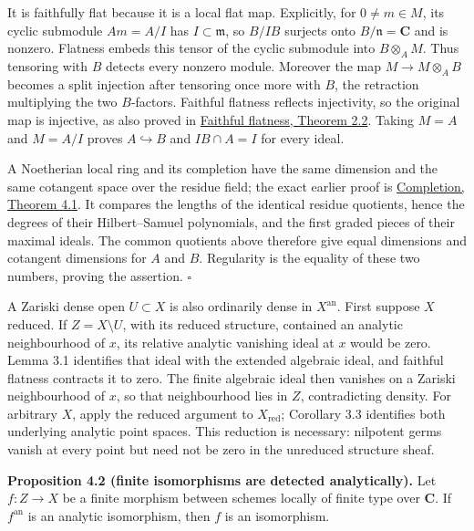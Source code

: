 \documentclass[11pt]{article}
\begin{document}
It is faithfully flat because it is a local flat map. Explicitly, for
\(0\ne m\in M\), its cyclic submodule \(Am=A/I\) has
\(I\subset\mathfrak m\), so \(B/IB\) surjects onto
\(B/\mathfrak n=\mathbf C\) and is nonzero. Flatness embeds this tensor
of the cyclic submodule into \(B\otimes_AM\). Thus tensoring with \(B\)
detects every nonzero module. Moreover the map \(M\to M\otimes_AB\)
becomes a split injection after tensoring once more with \(B\), the
retraction multiplying the two \(B\)-factors. Faithful flatness reflects
injectivity, so the original map is injective, as also proved in \href{../../../../../../AG-CA/AG-CA-08.html\#2-faithfully-flat-ring-maps}{Faithful flatness, Theorem 2.2}. Taking \(M=A\) and
\(M=A/I\) proves \(A\hookrightarrow B\) and \(IB\cap A=I\) for every
ideal.

A Noetherian local ring and its completion have the same dimension and
the same cotangent space over the residue field; the exact earlier proof
is
\href{../../../../../../AG-CA/AG-CA-19.html\#4-local-dimension-and-regularity}{Completion,
Theorem 4.1}. It compares the lengths of the identical residue
quotients, hence the degrees of their Hilbert--Samuel polynomials, and
the first graded pieces of their maximal ideals. The common quotients
above therefore give equal dimensions and cotangent dimensions for \(A\)
and \(B\). Regularity is the equality of these two numbers, proving the
assertion. \(\square\)

A Zariski dense open \(U\subset X\) is also ordinarily dense in
\(X^{\mathrm{an}}\). First suppose \(X\) reduced. If \(Z=X\setminus U\),
with its reduced structure, contained an analytic neighbourhood of
\(x\), its relative analytic vanishing ideal at \(x\) would be zero.
Lemma 3.1 identifies that ideal with the extended algebraic ideal, and
faithful flatness contracts it to zero. The finite algebraic ideal then
vanishes on a Zariski neighbourhood of \(x\), so that neighbourhood lies
in \(Z\), contradicting density. For arbitrary \(X\), apply the reduced
argument to \(X_{\mathrm{red}}\); Corollary 3.3 identifies both
underlying analytic point spaces. This reduction is necessary: nilpotent
germs vanish at every point but need not be zero in the unreduced
structure sheaf.

\textbf{Proposition 4.2 (finite isomorphisms are detected
analytically).} Let \(f:Z\to X\) be a finite morphism between schemes
locally of finite type over \(\mathbf C\). If \(f^{\mathrm{an}}\) is an
analytic isomorphism, then \(f\) is an isomorphism.
\end{document}
